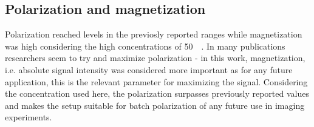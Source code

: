        \subsection{Polarization and magnetization}
            Polarization reached levels in the previosly reported ranges while magnetization was high considering the high concentrations of \SI{50}{\milli\molar}. In many publications researchers seem to try and maximize polarization - in this work, magnetization, i.e. absolute signal intensity was considered more important as for any future application, this is the relevant parameter for maximizing the signal. Considering the concentration used here, the polarization surpasses previously reported values and makes the setup suitable for batch polarization of any future use in imaging experiments.
